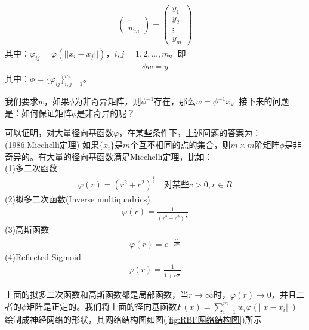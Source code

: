 {\begin{align*}
\begin{pmatrix}
            \vdots\\
            w_m
            \end{pmatrix}
            =
            \begin{pmatrix}
            y_1\\
            y_2\\
            \vdots\\
            y_m
            \end{pmatrix}
            \end{align*}
            其中：$\varphi_{ij} = \varphi(||x_i-x_j||)$，$i,j=1,2,\dots,m$。即
            \begin{align*}
            \phi w = y
            \end{align*}
            其中：$\phi = \{\varphi_{ij}\}_{i,j=1}^m$。
            \par
            我们要求$w$，如果$\phi$为非奇异矩阵，则$\phi^{-1}$存在，那么$w = \phi^{-1}x$。接下来的问题是：如何保证矩阵$\phi$是非奇异的呢？
            \par
            可以证明，对大量径向基函数$\varphi$，在某些条件下，上述问题的答案为：(1986.Micchelli定理)
            如果$\{x_i\}$是$m$个互不相同的点的集合，则$m\times m$阶矩阵$\phi$是非奇异的。有大量的径向基函数满足Micchelli定理，比如：\\
            (1)多二次函数
            \begin{align*}
            \varphi(r) = (r^2+c^2)^\frac{1}{2} \quad \text{对某些}c>0,r\in R
            \end{align*}
            (2)拟多二次函数(Inverse multiquadrics)
            \begin{align*}
            \varphi(r) = \frac{1}{(r^2+c^2)^\frac{1}{2}}
            \end{align*}
            (3)高斯函数
            \begin{align*}
            \varphi(r) = e^{-\frac{r^2}{2\sigma^2}}
            \end{align*}
            (4)Reflected Sigmoid
            \begin{align*}
            \varphi(r)=\frac{1}{1+e^{\frac{r^2}{\sigma^2}}}
            \end{align*}
            \par
            上面的拟多二次函数和高斯函数都是局部函数，当$r\rightarrow \infty$时，$\varphi(r)\rightarrow 0$，并且二者的$\phi$矩阵是正定的。我们将上面的径向基函数$F(x) = \sum\limits_{i=1}^mw_i\varphi(||x-x_i||)$绘制成神经网络的形状，其网络结构图如图(\ref{fig:RBF网络结构图})所示
}

